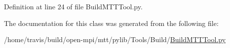 Definition at line 24 of file Build\-M\-T\-T\-Tool.\-py.



The documentation for this class was generated from the following file\-:\begin{DoxyCompactItemize}
\item 
/home/travis/build/open-\/mpi/mtt/pylib/\-Tools/\-Build/\hyperlink{_build_m_t_t_tool_8py}{Build\-M\-T\-T\-Tool.\-py}\end{DoxyCompactItemize}
